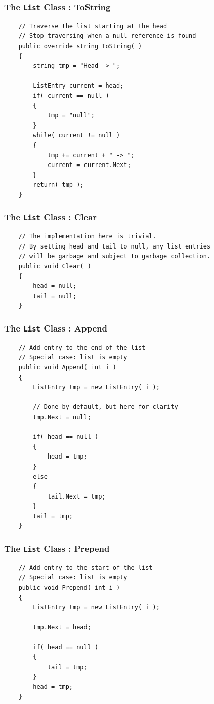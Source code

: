 \begin{frame}[fragile]
\frametitle{The \texttt{List} Class : ToString}

{\scriptsize
\begin{verbatim}
    // Traverse the list starting at the head
    // Stop traversing when a null reference is found
    public override string ToString( )
    {
        string tmp = "Head -> ";

        ListEntry current = head;
        if( current == null )
        {
            tmp = "null";
        }
        while( current != null )
        {
            tmp += current + " -> ";
            current = current.Next;
        }
        return( tmp );
    }
\end{verbatim}
}

\end{frame}

\begin{frame}[fragile]
\frametitle{The \texttt{List} Class : Clear}
{\scriptsize
\begin{verbatim}
    // The implementation here is trivial.
    // By setting head and tail to null, any list entries
    // will be garbage and subject to garbage collection.
    public void Clear( )
    {
        head = null;
        tail = null;
    }
\end{verbatim}
}
\end{frame}

\begin{frame}[fragile]
\frametitle{The \texttt{List} Class : Append}

{\scriptsize
\begin{verbatim}
    // Add entry to the end of the list
    // Special case: list is empty
    public void Append( int i )
    {
        ListEntry tmp = new ListEntry( i );
        
        // Done by default, but here for clarity
        tmp.Next = null;

        if( head == null )
        {
            head = tmp;
        }
        else
        {
            tail.Next = tmp;
        }
        tail = tmp;
    }
\end{verbatim}
}

\end{frame}

\begin{frame}[fragile]
\frametitle{The \texttt{List} Class : Prepend}

{\scriptsize
\begin{verbatim}
    // Add entry to the start of the list
    // Special case: list is empty
    public void Prepend( int i )
    {
        ListEntry tmp = new ListEntry( i );

        tmp.Next = head;

        if( head == null )
        {
            tail = tmp;
        }
        head = tmp;
    }
\end{verbatim}
}
\end{frame}

